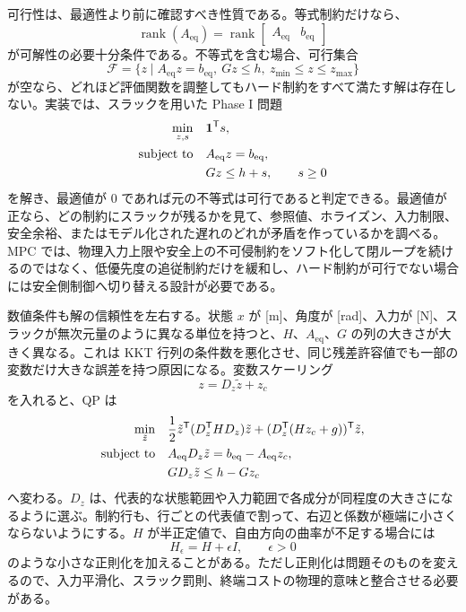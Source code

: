 可行性は、最適性より前に確認すべき性質である。等式制約だけなら、
\begin{equation}
  \operatorname{rank}(A_{\mathrm{eq}})
  =
  \operatorname{rank}
  \begin{bmatrix}
    A_{\mathrm{eq}}&b_{\mathrm{eq}}
  \end{bmatrix}
\end{equation}
が可解性の必要十分条件である。不等式を含む場合、可行集合
\begin{equation}
  \mathcal{F}
  =
  \{z\mid A_{\mathrm{eq}}z=b_{\mathrm{eq}},\ Gz\le h,\ z_{\min}\le z\le z_{\max}\}
\end{equation}
が空なら、どれほど評価関数を調整してもハード制約をすべて満たす解は存在しない。実装では、スラックを用いた Phase I 問題
\begin{align}
  \min_{z,s}\quad &\mathbf{1}^{\mathsf{T}} s,\\
  \text{subject to}\quad &
  A_{\mathrm{eq}}z=b_{\mathrm{eq}},\\
  &Gz\le h+s,\qquad s\ge0
\end{align}
を解き、最適値が 0 であれば元の不等式は可行であると判定できる。最適値が正なら、どの制約にスラックが残るかを見て、参照値、ホライズン、入力制限、安全余裕、またはモデル化された遅れのどれが矛盾を作っているかを調べる。MPC では、物理入力上限や安全上の不可侵制約をソフト化して閉ループを続けるのではなく、低優先度の追従制約だけを緩和し、ハード制約が可行でない場合には安全側制御へ切り替える設計が必要である。

数値条件も解の信頼性を左右する。状態 $x$ が [m]、角度が [rad]、入力が [N]、スラックが無次元量のように異なる単位を持つと、$H$、$A_{\mathrm{eq}}$、$G$ の列の大きさが大きく異なる。これは KKT 行列の条件数を悪化させ、同じ残差許容値でも一部の変数だけ大きな誤差を持つ原因になる。変数スケーリング
\begin{equation}
  z=D_z\tilde{z}+z_c
\end{equation}
を入れると、QP は
\begin{align}
  \min_{\tilde{z}}\quad &
  \frac{1}{2}\tilde{z}^{\mathsf{T}}(D_z^{\mathsf{T}} HD_z)\tilde{z}
  +(D_z^{\mathsf{T}}(H z_c+g))^{\mathsf{T}}\tilde{z},\\
  \text{subject to}\quad &
  A_{\mathrm{eq}}D_z\tilde{z}=b_{\mathrm{eq}}-A_{\mathrm{eq}}z_c,\\
  &GD_z\tilde{z}\le h-Gz_c
\end{align}
へ変わる。$D_z$ は、代表的な状態範囲や入力範囲で各成分が同程度の大きさになるように選ぶ。制約行も、行ごとの代表値で割って、右辺と係数が極端に小さくならないようにする。$H$ が半正定値で、自由方向の曲率が不足する場合には
\begin{equation}
  H_\epsilon=H+\epsilon I,
  \qquad
  \epsilon>0
\end{equation}
のような小さな正則化を加えることがある。ただし正則化は問題そのものを変えるので、入力平滑化、スラック罰則、終端コストの物理的意味と整合させる必要がある。

